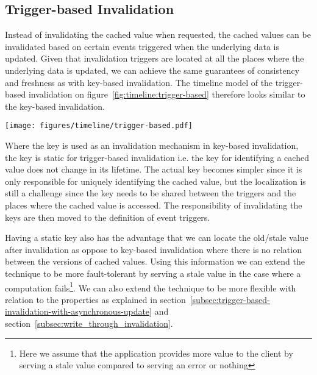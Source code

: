 
\subsection{Trigger-based Invalidation}
\label{subsec:trigger_based_invalidation}

Instead of invalidating the cached value when requested, the cached values can be invalidated based on certain events triggered when the underlying data is updated. Given that invalidation triggers are located at all the places where the underlying data is updated, we can achieve the same guarantees of consistency and freshness as with key-based invalidation. The timeline model of the trigger-based invalidation on figure~\ref{fig:timeline:trigger-based} therefore looks similar to the key-based invalidation.

\begin{figure*}[ht!]
  \centering
  \texttt{[image: figures/timeline/trigger-based.pdf]}
  \caption{The lifecycle of the trigger-based invalidation technique}
  \label{fig:timeline:trigger-based}
\end{figure*}

Where the key is used as an invalidation mechanism in key-based invalidation, the key is static for trigger-based invalidation i.e. the key for identifying a cached value does not change in its lifetime. The actual key becomes simpler since it is only responsible for uniquely identifying the cached value, but the localization is still a challenge since the key needs to be shared between the triggers and the places where the cached value is accessed. The responsibility of invalidating the keys are then moved to the definition of event triggers.

Having a static key also has the advantage that we can locate the old/stale value after invalidation as oppose to key-based invalidation where there is no relation between the versions of cached values. Using this information we can extend the technique to be more fault-tolerant by serving a stale value in the case where a computation fails\footnote{Here we assume that the application provides more value to the client by serving a stale value compared to serving an error or nothing}. We can also extend the technique to be more flexible with relation to the properties as explained in section~\ref{subsec:trigger-based-invalidation-with-asynchronous-update} and section~\ref{subsec:write_through_invalidation}.

